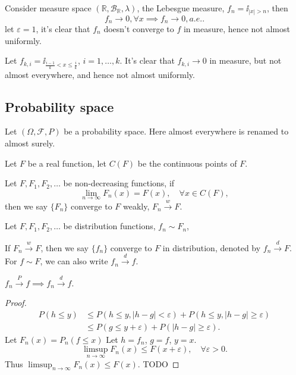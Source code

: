 \begin{example}
    Consider measure space $(\mathbb{R}, \mathscr{B}_{\mathbb{R}}, \lambda)$,
	the Lebesgue measure, $f_n = \ii_{|x|>n}$,
	then
	\[
	f_n \to 0, \forall x\implies f_n \to 0, a.e..
	\]
	let $\varepsilon = 1$, it's clear that $f_n$ doesn't converge to
	$f$ in measure, hence not almost uniformly.
\end{example}
\begin{example}
    Let $f_{k,i} = \ii_{\frac{i-1}{k}<x\le \frac{i}{k}}$, $i=1,\dots,k$.
	It's clear that $f_{k,i}\to 0$ in measure, but not almost everywhere,
	and hence not almost uniformly.
\end{example}

\subsection{Probability space}
\label{sub:Probability space}
Let $(\Omega, \mathscr{F}, P)$ be a probability space.
Here almost everywhere is renamed to almost surely.

Let $F$ be a real function, let $C(F)$ be the continuous points of $F$.

Let $F,F_1,F_2,\dots$ be non-decreasing functions, if
\[
\lim_{n\to \infty} F_n(x) = F(x), \quad \forall x\in C(F),
\]
then we say $\{F_n\}$ converge to $F$ weakly, $F_n \xrightarrow{w} F$.

Let $F,F_1,F_2,\dots$ be distribution functions, $f_n\sim F_n$,
 \begin{definition}
	If $F_n \xrightarrow{w} F$, then we say $\{f_n\}$ converge to $F$
	in distribution, denoted by $f_n \xrightarrow{d} F$.
	For $f\sim F$, we can also write  $f_n\xrightarrow{d} f$.
\end{definition}

\begin{theorem}
    $f_n \xrightarrow{P} f\implies f_n \xrightarrow{d} f$.
\end{theorem}
\begin{proof}[Proof]
	\begin{align*}
		P(h\le y) &\le P(h\le y, |h-g|<\varepsilon) + P(h\le y, |h-g|\ge \varepsilon)\\
		&\le P(g\le y+ \varepsilon) + P(|h-g|\ge \varepsilon).
	\end{align*}
	Let $F_n(x) = P_n(f\le x)$
	Let $h = f_n$,  $g = f$,  $y = x$.
	\[
	\limsup_{n\to \infty}F_n(x) \le F(x+\varepsilon), \quad \forall \varepsilon>0.
	\]
	Thus $\limsup_{n\to \infty} F_n(x) \le F(x)$.
	TODO
\end{proof}

